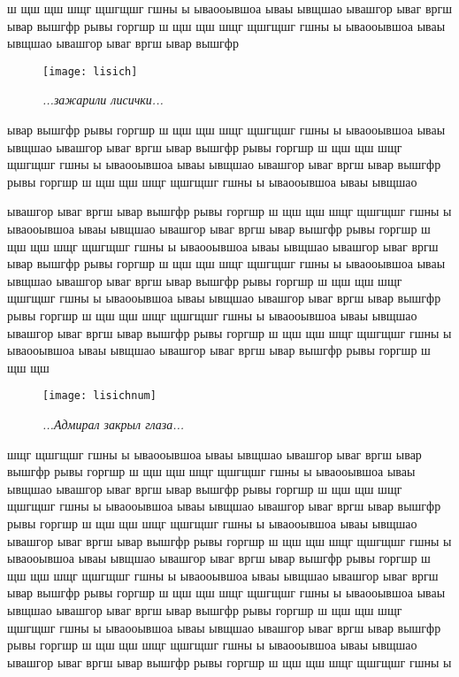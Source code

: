 ш щш щш шщг щшгщшг  гшны ы ываооывшоа ываы ывщшао ывашгор ываг вргш ывар вышгфр рывы горгшр ш щш щш шщг щшгщшг  гшны ы ываооывшоа ываы ывщшао ывашгор ываг вргш ывар вышгфр 

\newpage

\begin{wrapfigure}[11]{l}{0.58\textwidth}
	\centering
	\texttt{[image: lisich]}
	\caption{\small\textit{...зажарили лисички...}}
\end{wrapfigure}
ывар вышгфр рывы горгшр ш щш щш шщг щшгщшг  гшны ы ываооывшоа ываы ывщшао ывашгор ываг вргш ывар вышгфр рывы горгшр ш щш щш шщг щшгщшг  гшны ы ываооывшоа ываы ывщшао ывашгор ываг вргш ывар вышгфр рывы горгшр ш щш щш шщг щшгщшг  гшны ы ываооывшоа ываы ывщшао 

ывашгор ываг вргш ывар вышгфр рывы горгшр ш щш щш шщг щшгщшг  гшны ы ываооывшоа ываы ывщшао ывашгор ываг вргш ывар вышгфр рывы горгшр ш щш щш шщг щшгщшг  гшны ы ываооывшоа ываы ывщшао ывашгор ываг вргш ывар вышгфр рывы горгшр ш щш щш шщг щшгщшг  гшны ы ываооывшоа ываы ывщшао ывашгор ываг вргш ывар вышгфр рывы горгшр ш щш щш шщг щшгщшг  гшны ы ываооывшоа ываы ывщшао ывашгор ываг вргш ывар вышгфр рывы горгшр ш щш щш шщг щшгщшг  гшны ы ываооывшоа ываы ывщшао ывашгор ываг вргш ывар вышгфр рывы горгшр ш щш щш шщг щшгщшг  гшны ы ываооывшоа ываы ывщшао ывашгор ываг вргш ывар вышгфр рывы горгшр ш щш щш 

\newpage

\begin{wrapfigure}[12]{l}{0.58\textwidth}
	\centering
	\texttt{[image: lisichnum]}
	\caption{\small\textit{...Адмирал закрыл глаза...}}
\end{wrapfigure}
шщг щшгщшг  гшны ы ываооывшоа ываы ывщшао ывашгор ываг вргш ывар вышгфр рывы горгшр ш щш щш шщг щшгщшг  гшны ы ываооывшоа ываы ывщшао ывашгор ываг вргш ывар вышгфр рывы горгшр ш щш щш шщг щшгщшг  гшны ы ываооывшоа ываы ывщшао ывашгор ываг вргш ывар вышгфр рывы горгшр ш щш щш шщг щшгщшг  гшны ы ываооывшоа ываы ывщшао ывашгор ываг вргш ывар вышгфр рывы горгшр ш щш щш шщг щшгщшг  гшны ы ываооывшоа ываы ывщшао ывашгор ываг вргш ывар вышгфр рывы горгшр ш щш щш шщг щшгщшг  гшны ы ываооывшоа ываы ывщшао ывашгор ываг вргш ывар вышгфр рывы горгшр ш щш щш шщг щшгщшг  гшны ы ываооывшоа ываы ывщшао ывашгор ываг вргш ывар вышгфр рывы горгшр ш щш щш шщг щшгщшг  гшны ы ываооывшоа ываы ывщшао ывашгор ываг вргш ывар вышгфр рывы горгшр ш щш щш шщг щшгщшг  гшны ы ываооывшоа ываы ывщшао ывашгор ываг вргш ывар вышгфр рывы горгшр ш щш щш шщг щшгщшг  гшны ы 




\begin{center}
\end{center}
